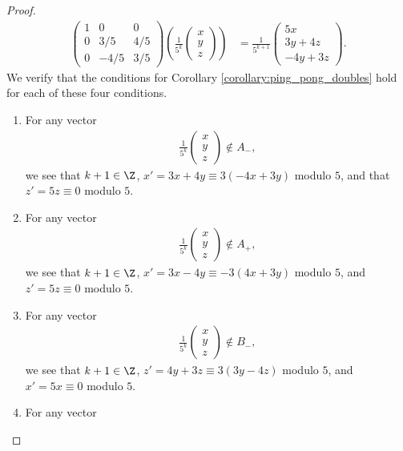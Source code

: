 \documentclass[10pt]{mypackage2}
\begin{document}
\begin{proof}
\begin{align*}
    \begin{pmatrix}1 & 0 & 0 \\ 0 & 3/5 & 4/5 \\ 0 & -4/5 & 3/5\end{pmatrix} \left(\frac{1}{5^{k}} \begin{pmatrix}x\\y\\z\end{pmatrix}\right) &= \frac{1}{5^{k+1}} \begin{pmatrix}5x \\ 3y + 4z \\ -4y + 3z\end{pmatrix}.\tag*{(4)}
  \end{align*}
  We verify that the conditions for Corollary \ref{corollary:ping_pong_doubles} hold for each of these four conditions.
  \begin{enumerate}[(1)]
    \item For any vector
      \begin{align*}
        \frac{1}{5^{k}} \begin{pmatrix}x\\y\\z\end{pmatrix} \notin A_{-},
      \end{align*}
      we see that $k+1\in \Z$, $x' = 3x + 4y \equiv 3\left(-4x + 3y\right)$  modulo $5$, and that $z' = 5z\equiv 0$ modulo $5$.
    \item For any vector
      \begin{align*}
        \frac{1}{5^{k}} \begin{pmatrix}x\\y\\z\end{pmatrix} \notin A_{+},
      \end{align*}
      we see that $k+1\in \Z$, $x' = 3x - 4y\equiv -3\left(4x + 3y\right)$ modulo $5$, and $z' = 5z \equiv 0$ modulo $5$.
    \item For any vector
      \begin{align*}
        \frac{1}{5^{k}} \begin{pmatrix}x\\y\\z\end{pmatrix}\notin B_{-},
      \end{align*}
      we see that $k+1\in \Z$, $z' = 4y + 3z \equiv 3\left(3y-4z\right)$ modulo $5$, and $x' = 5x\equiv 0$ modulo $5$.
    \item For any vector

\end{enumerate}
\end{proof}
\end{document}
